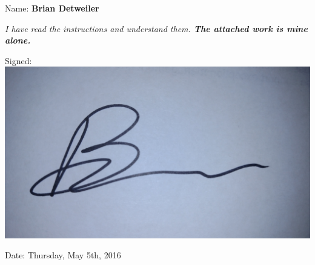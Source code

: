 \begin{titlepage}

Name: \textbf{Brian Detweiler}\\

\vspace{1in}

\textit{I have read the instructions and understand them. \textbf{The attached work is mine alone.}}

\vspace{1in}

Signed: \includegraphics[height=7\baselineskip]{sig} \par

\vspace{1in}

Date: Thursday, May 5th, 2016


\vfill

\end{titlepage}
